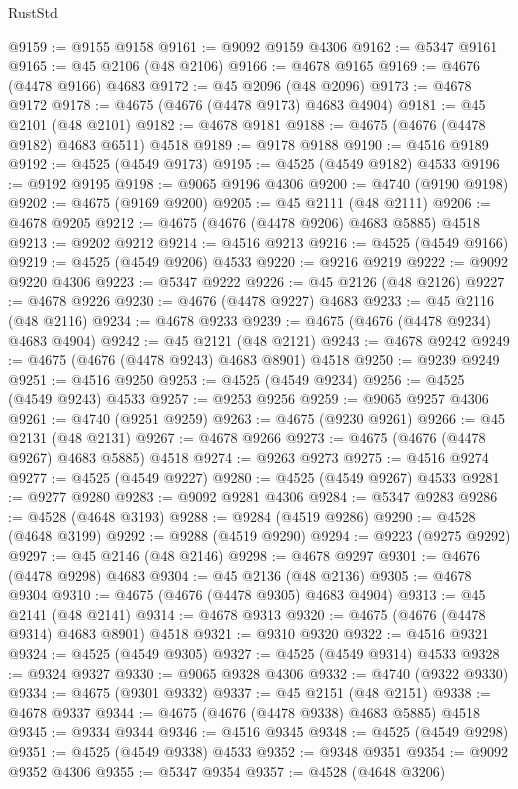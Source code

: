 \begin{lexlean}{RustStd}
\begin{coremodule}
{\begin{coremodule}
{{{{{{{{{{{{{{{{{{{{{{{{{{{{{{{{{{{{{{{{{{{{{{{{{{{{{{{{{{{{@9159 := @9155 @9158
@9161 := @9092 @9159 @4306
@9162 := @5347 @9161
@9165 := @45 @2106 (@48 @2106)
@9166 := @4678 @9165
@9169 := @4676 (@4478 @9166) @4683
@9172 := @45 @2096 (@48 @2096)
@9173 := @4678 @9172
@9178 := @4675 (@4676 (@4478 @9173) @4683 @4904)
@9181 := @45 @2101 (@48 @2101)
@9182 := @4678 @9181
@9188 := @4675 (@4676 (@4478 @9182) @4683 @6511) @4518
@9189 := @9178 @9188
@9190 := @4516 @9189
@9192 := @4525 (@4549 @9173)
@9195 := @4525 (@4549 @9182) @4533
@9196 := @9192 @9195
@9198 := @9065 @9196 @4306
@9200 := @4740 (@9190 @9198)
@9202 := @4675 (@9169 @9200)
@9205 := @45 @2111 (@48 @2111)
@9206 := @4678 @9205
@9212 := @4675 (@4676 (@4478 @9206) @4683 @5885) @4518
@9213 := @9202 @9212
@9214 := @4516 @9213
@9216 := @4525 (@4549 @9166)
@9219 := @4525 (@4549 @9206) @4533
@9220 := @9216 @9219
@9222 := @9092 @9220 @4306
@9223 := @5347 @9222
@9226 := @45 @2126 (@48 @2126)
@9227 := @4678 @9226
@9230 := @4676 (@4478 @9227) @4683
@9233 := @45 @2116 (@48 @2116)
@9234 := @4678 @9233
@9239 := @4675 (@4676 (@4478 @9234) @4683 @4904)
@9242 := @45 @2121 (@48 @2121)
@9243 := @4678 @9242
@9249 := @4675 (@4676 (@4478 @9243) @4683 @8901) @4518
@9250 := @9239 @9249
@9251 := @4516 @9250
@9253 := @4525 (@4549 @9234)
@9256 := @4525 (@4549 @9243) @4533
@9257 := @9253 @9256
@9259 := @9065 @9257 @4306
@9261 := @4740 (@9251 @9259)
@9263 := @4675 (@9230 @9261)
@9266 := @45 @2131 (@48 @2131)
@9267 := @4678 @9266
@9273 := @4675 (@4676 (@4478 @9267) @4683 @5885) @4518
@9274 := @9263 @9273
@9275 := @4516 @9274
@9277 := @4525 (@4549 @9227)
@9280 := @4525 (@4549 @9267) @4533
@9281 := @9277 @9280
@9283 := @9092 @9281 @4306
@9284 := @5347 @9283
@9286 := @4528 (@4648 @3193)
@9288 := @9284 (@4519 @9286)
@9290 := @4528 (@4648 @3199)
@9292 := @9288 (@4519 @9290)
@9294 := @9223 (@9275 @9292)
@9297 := @45 @2146 (@48 @2146)
@9298 := @4678 @9297
@9301 := @4676 (@4478 @9298) @4683
@9304 := @45 @2136 (@48 @2136)
@9305 := @4678 @9304
@9310 := @4675 (@4676 (@4478 @9305) @4683 @4904)
@9313 := @45 @2141 (@48 @2141)
@9314 := @4678 @9313
@9320 := @4675 (@4676 (@4478 @9314) @4683 @8901) @4518
@9321 := @9310 @9320
@9322 := @4516 @9321
@9324 := @4525 (@4549 @9305)
@9327 := @4525 (@4549 @9314) @4533
@9328 := @9324 @9327
@9330 := @9065 @9328 @4306
@9332 := @4740 (@9322 @9330)
@9334 := @4675 (@9301 @9332)
@9337 := @45 @2151 (@48 @2151)
@9338 := @4678 @9337
@9344 := @4675 (@4676 (@4478 @9338) @4683 @5885) @4518
@9345 := @9334 @9344
@9346 := @4516 @9345
@9348 := @4525 (@4549 @9298)
@9351 := @4525 (@4549 @9338) @4533
@9352 := @9348 @9351
@9354 := @9092 @9352 @4306
@9355 := @5347 @9354
@9357 := @4528 (@4648 @3206)
}}}}}}}}}}}}}}}}}}}}}}}}}}}}}}}}}}}}}}}}}}}}}}}}}}}}}}}}}}}}
\end{coremodule}}
\end{coremodule}
\end{lexlean}
